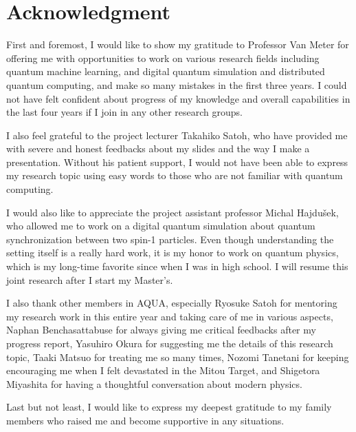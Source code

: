 \chapter*{Acknowledgment}
\label{thanks}

First and foremost, I would like to show my gratitude to Professor Van Meter for offering me with opportunities to work on various research fields including quantum machine learning, and digital quantum simulation and distributed quantum computing, and make so many mistakes in the first three years. I could not have felt confident about progress of my knowledge and overall capabilities in the last four years if I join in any other research groups.

I also feel grateful to the project lecturer Takahiko Satoh, who have provided me with severe and honest feedbacks about my slides and the way I make a presentation.  Without his patient support, I would not have been able to express my research topic using easy words to those who are not familiar with quantum computing.

I would also like to appreciate the project assistant professor Michal Hajdušek, who allowed me to work on a digital quantum simulation about quantum synchronization between two spin-1 particles.  Even though understanding the setting itself is a really hard work, it is my honor to work on quantum physics, which is my long-time favorite since when I was in high school.  I will resume this joint research after I start my Master's.

I also thank other members in AQUA, especially Ryosuke Satoh for mentoring my research work in this entire year and taking care of me in various aspects, Naphan Benchasattabuse for always giving me critical feedbacks after my progress report, Yasuhiro Okura for suggesting me the details of this research topic, Taaki Matsuo for treating me so many times, Nozomi Tanetani for keeping encouraging me when I felt devastated in the Mitou Target, and Shigetora Miyashita for having a thoughtful conversation about modern physics.

Last but not least, I would like to express my deepest gratitude to my family members who raised me and become supportive in any situations.  
